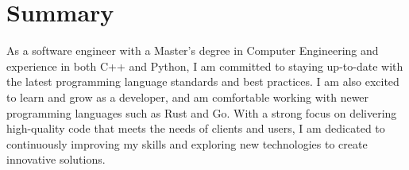 \section{Summary}

\begin{itemize}
    \cventryi
        {As a software engineer with a Master's degree in Computer Engineering and experience in both C++ and Python, I am committed to staying up-to-date with the latest programming language standards and best practices. I am also excited to learn and grow as a developer, and am comfortable working with newer programming languages such as Rust and Go. With a strong focus on delivering high-quality code that meets the needs of clients and users, I am dedicated to continuously improving my skills and exploring new technologies to create innovative solutions.}
\end{itemize}
